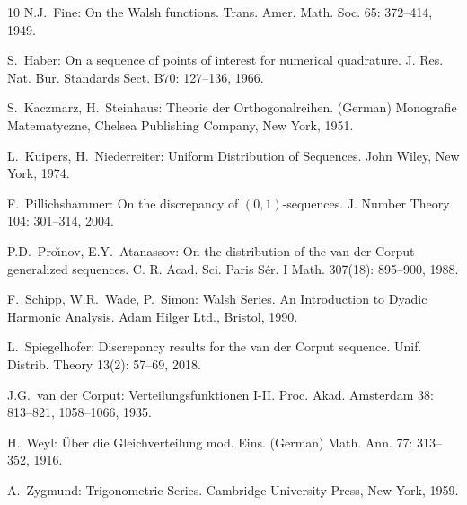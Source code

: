 \documentclass[12pt]{article}
\begin{document}
\begin{thebibliography}{10}
 N.J.~Fine: On the Walsh functions. Trans. Amer. Math. Soc. 65: 372--414, 1949.


 S.~Haber: On a sequence of points of interest for numerical quadrature. J. Res. Nat. Bur. Standards Sect. B70: 127--136, 1966.

 S.~Kaczmarz, H.~Steinhaus: Theorie der Orthogonalreihen. (German) Monografie Matematyczne, Chelsea Publishing Company, New York, 1951. 


 L.~Kuipers, H.~Niederreiter: Uniform Distribution of Sequences. John Wiley, New York, 1974.


 F.~Pillichshammer: On the discrepancy of $(0,1)$-sequences. J. Number Theory 104: 301--314, 2004.




 P.D.~Pro\u{\i}nov, E.Y.~Atanassov: On the distribution of the van der Corput generalized sequences. C. R. Acad. Sci. Paris S\'er. I Math. 307(18): 895--900, 1988.



 F.~Schipp, W.R.~Wade, P.~Simon: Walsh Series. An Introduction to Dyadic Harmonic Analysis. Adam Hilger Ltd., Bristol, 1990. 

 L.~Spiegelhofer: Discrepancy results for the van der Corput sequence. Unif. Distrib. Theory 13(2): 57--69, 2018.

 J.G.~van der Corput: Verteilungsfunktionen I-II. Proc. Akad. Amsterdam 38: 813--821, 1058--1066, 1935.

 H.~Weyl: \"Uber die Gleichverteilung mod. Eins. (German) Math. Ann. 77: 313--352, 1916. 

 A.~Zygmund: Trigonometric Series. Cambridge University Press, New York, 1959.


\end{thebibliography}
\end{document}
